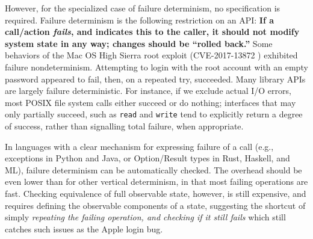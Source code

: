 
However, for the specialized case of  failure determinism, no
specification is required.
Failure determinism is the following restriction on an API: {\bf If a call/action \emph{fails}, and indicates this to the caller, it should not modify system
  state in any way; changes should be ``rolled back.''}   Some behaviors of the Mac OS High Sierra
root exploit (CVE-2017-13872 \cite{applebug0}) exhibited failure
nondeterminism.  Attempting to login with the root account with an
empty password appeared to fail, then, on a repeated try, succeeded.   Many library APIs are largely failure deterministic.  For instance, if
we exclude actual I/O errors, most POSIX file system calls either
succeed or do nothing; interfaces that may only partially succeed,
such as {\tt read} and {\tt write} tend to explicitly return a degree of success, rather than signalling total failure, when appropriate.  

In languages with a clear mechanism for expressing failure of a call
(e.g., exceptions in Python and Java, or Option/Result types in Rust,
Haskell, and ML), failure determinism can be automatically checked.
The overhead should be even lower than for other vertical determinism, in that most failing
operations are fast.  Checking equivalence of full
observable state, however, is still expensive, and requires defining
the observable components of a state, suggesting the shortcut of simply
\emph{repeating the failing operation, and checking if it still fails}
which still catches such issues as the Apple login bug. 

